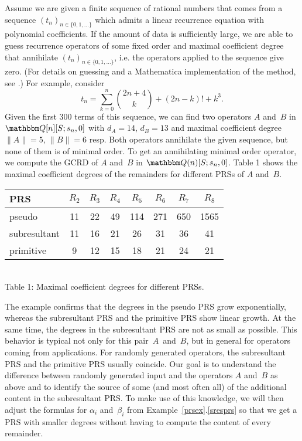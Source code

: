 \documentclass[3p,11pt,preprint]{elsarticle}
\let\set\mathbbm
\begin{document}
\begin{example}
\label{mainex}
 Assume we are given a finite sequence of rational numbers that comes from a sequence $(t_n)_{n\in\{0,1,\dots\}}$ which admits a linear recurrence equation with polynomial coefficients. If the amount of data is sufficiently large, we are able to guess recurrence operators of some fixed order and maximal coefficient degree that annihilate $(t_n)_{n\in\{0,1,\dots\}}$, i.e. the operators applied to the sequence give zero. (For details on guessing and a Mathematica implementation of the method, see \cite{kauers}.)
 For example, consider 
 \[t_n = \sum_{k=0}^{n}{\binom{2n+4}{k}+(2n-k)! + k^3}.\]
 Given the first 300 terms of this sequence, we can find two operators $A$ and~$B$ in $\set Q[n][S;s_n,0]$ with $d_A=14$, $d_B=13$ and maximal coefficient degree $\lVert A\rVert=5$, $\lVert B\rVert=6$ resp. Both operators annihilate the given sequence, but none of them is of minimal order. To get an annihilating minimal order operator, we compute the GCRD of $A$ and~$B$ in $\set Q(n)[S;s_n,0]$. Table 1 shows the maximal coefficient degrees of the remainders for different PRSs of $A$ and~$B$.
\begin{center}
\begin{tabular}{l|c|c|c|c|c|c|c}
PRS & $R_2$ & $R_3$ & $R_4$ & $R_5$ & $R_6$ & $R_7$ & $R_8$\\
\hline
 pseudo & 11 & 22 & 49 & 114 & 271 & 650 & 1565\\
\hline
 subresultant & 11 & 16 & 21 & 26 & 31 & 36 & 41\\
\hline
 primitive & 9 & 12 & 15 & 18 & 21 & 24 & 21\\
\end{tabular}\\
\vspace{0.1cm}\scriptsize{Table 1: Maximal coefficient degrees for different PRSs.}
\end{center}
The example confirms that the degrees in the pseudo PRS grow exponentially, whereas the subresultant PRS and the primitive PRS show linear growth. At the same time, the degrees in the subresultant PRS are not as small as possible. This behavior is typical not only for this pair~$A$~and~$B$, but in general for operators coming from applications. For randomly generated operators, the subresultant PRS and the primitive PRS usually coincide. Our goal is to understand the difference between randomly generated input and the operators $A$ and~$B$ as above and to identify the source of some (and most often all) of the additional content in the subresultant PRS. To make use of this knowledge, we will then adjust the formulas for $\alpha_i$ and~$\beta_i$ from Example~\ref{prsex}.\ref{sresprs} so that we get a PRS with smaller degrees without having to compute the content of every remainder.
\end{example}
\end{document}
